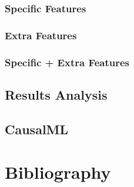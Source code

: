 \documentclass[12pt,letterpaper]{article}
\begin{document}
\subsubsection{Specific Features}

\clearpage

\clearpage


\clearpage

\clearpage

\clearpage

\subsubsection{Extra Features}

\clearpage

\subsubsection{Specific + Extra Features}


\clearpage

\clearpage

\clearpage

\clearpage

\clearpage

\clearpage

\clearpage

\subsection{Results Analysis}











\subsection{CausalML}


\clearpage

\section{Bibliography}

\end{document}
